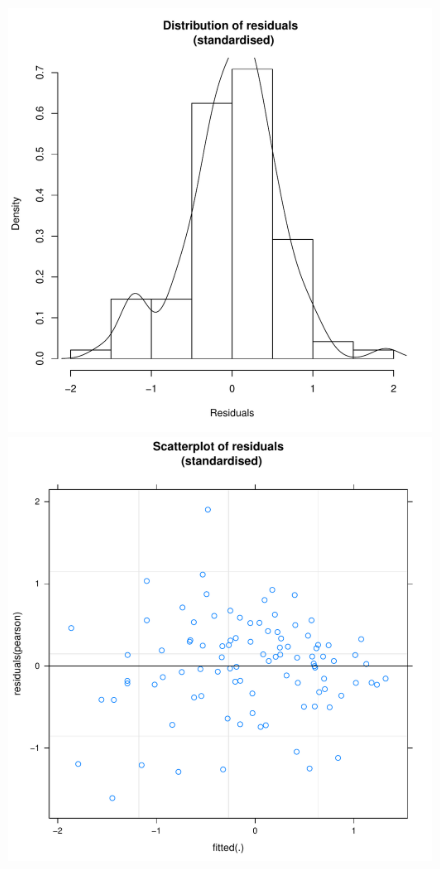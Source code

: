 \begin{CJK}{UTF8}{gbsn}
 \begin{figure}[htbp]
     \includegraphics[scale =.4]{images/MLM1aHist.pdf}
     \includegraphics[scale =.4]{images/MLM1aScatter.pdf}

\end{figure}
\end{CJK}
